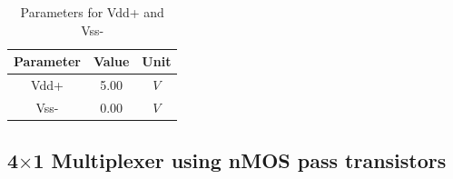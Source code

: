 \documentclass[a4paper,12pt]{article}
\begin{document}
	
	\begin{table}[H]
		\centering
		\caption{Parameters for Vdd+ and Vss- }
		\begin{tabular}{|c|c|c|}
			\hline
			\textbf{Parameter} & \textbf{Value} & \textbf{Unit} \\ \hline
			Vdd+               & 5.00           & $V $            \\ \hline
			Vss-               & 0.00           & $V$             \\ \hline
		\end{tabular}
		
	\end{table}
	
	
	
	\newpage
		\subsection{4$\times$1 Multiplexer using nMOS pass transistors}
		
\end{document}
